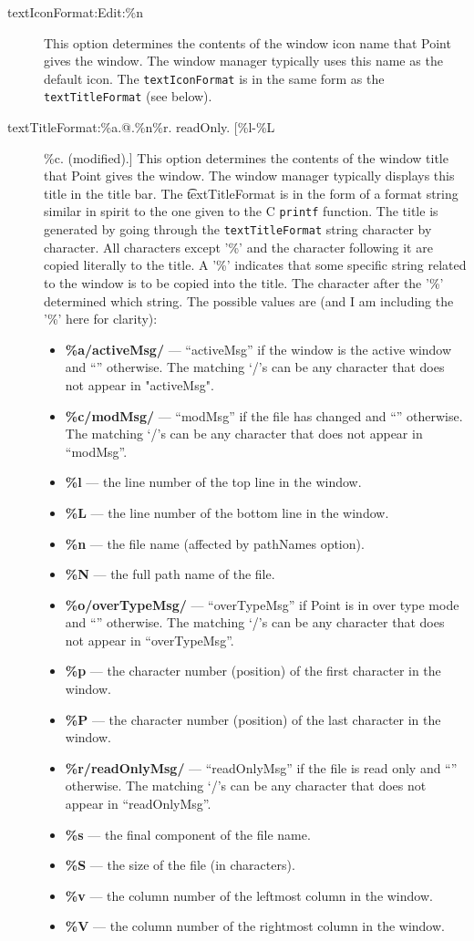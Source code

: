 \begin{description}
\item[textIconFormat:Edit:\%n]
This option determines the contents of the window icon name that
Point gives the window.
The window manager typically uses this name as the default icon.
The {\tt textIconFormat} is in the same form as the {\tt textTitleFormat}
(see below).

\item[textTitleFormat:\%a.@.\%n\%r. readOnly. [\%l-\%L]\%c. (modified).]
This option determines the contents of the window title that
Point gives the window.
The window manager typically displays this title in the title bar.
The {\t textTitleFormat} is in the form of a format string similar in spirit
to the one given to the C {\tt printf} function.
The title is generated by going through the {\tt textTitleFormat} string
character by character.
All characters except '\%' and the character following it
are copied literally to the title.
A '\%' indicates that some specific string related to the window
is to be copied into the title.
The character after the '\%' determined which string.
The possible values are (and I am including the '\%' here for clarity):
\begin{itemize}
\item {\bf \%a/activeMsg/} --- ``activeMsg'' if the window is the active
		window and ``'' otherwise.
		The matching `/'s can be any character that does not
		appear in "activeMsg".
\item {\bf \%c/modMsg/} --- ``modMsg'' if the file has changed and
		``'' otherwise.
		The matching `/'s can be any character that does not
		appear in ``modMsg''.
\item {\bf \%l} --- the line number of the top line in the window.
\item {\bf \%L} --- the line number of the bottom line in the window.
\item {\bf \%n} --- the file name (affected by pathNames option).
\item {\bf \%N} --- the full path name of the file.
\item {\bf \%o/overTypeMsg/} --- ``overTypeMsg'' if Point is in over type
		mode and ``'' otherwise.
		The matching `/'s can be any character that does not
		appear in ``overTypeMsg''.
\item {\bf \%p} --- the character number (position) of the first character
		in the window.
\item {\bf \%P} --- the character number (position) of the last character
		in the window.
\item {\bf \%r/readOnlyMsg/} --- ``readOnlyMsg'' if the file is read only
		and ``'' otherwise.
		The matching `/'s can be any character that does not
		appear in ``readOnlyMsg''.
\item {\bf \%s} --- the final component of the file name.
\item {\bf \%S} --- the size of the file (in characters).
\item {\bf \%v} --- the column number of the leftmost column in the window.
\item {\bf \%V} --- the column number of the rightmost column in the window.
\end{itemize}


\end{description}
